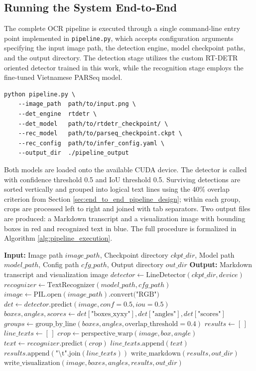 \subsection{Running the System End-to-End}
The complete OCR pipeline is executed through a single command-line entry point implemented in \texttt{pipeline.py}, which accepts configuration arguments specifying the input image path, the detection engine, model checkpoint paths, and the output directory. The detection stage utilizes the custom RT-DETR oriented detector trained in this work, while the recognition stage employs the fine-tuned Vietnamese PARSeq model. 

\begin{verbatim}
python pipeline.py \
    --image_path  path/to/input.png \
    --det_engine  rtdetr \
    --det_model   path/to/rtdetr_checkpoint/ \
    --rec_model   path/to/parseq_checkpoint.ckpt \
    --rec_config  path/to/infer_config.yaml \
    --output_dir  ./pipeline_output
\end{verbatim}

Both models are loaded onto the available CUDA device. The detector is called with confidence threshold 0.5 and IoU threshold 0.5. Surviving detections are sorted vertically and grouped into logical text lines using the 40\% overlap criterion from Section \ref{sec:end_to_end_pipeline_design}; within each group, crops are processed left to right and joined with tab separators. Two output files are produced: a Markdown transcript and a visualization image with bounding boxes in red and recognized text in blue. The full procedure is formalized in Algorithm \ref{alg:pipeline_execution}.

\begin{algorithm}[ht]
\caption{End-to-End OCR Pipeline Execution}
\label{alg:pipeline_execution}
\begin{algorithmic}[1]
\Statex \textbf{Input:} Image path $image\_path$, Checkpoint directory $ckpt\_dir$, Model path $model\_path$, Config path $cfg\_path$, Output directory $out\_dir$
\Statex \textbf{Output:} Markdown transcript and visualization image
\State $detector \gets \text{LineDetector}(ckpt\_dir, device)$
\State $recognizer \gets \text{TextRecognizer}(model\_path, cfg\_path)$
\State $image \gets \text{PIL.open}(image\_path)\text{.convert("RGB")}$
\State $det \gets detector.\text{predict}(image, conf=0.5, iou=0.5)$
\State $boxes, angles, scores \gets det[\text{"boxes\_xyxy"}], det[\text{"angles"}], det[\text{"scores"}]$
\State $groups \gets \text{group\_by\_line}(boxes, angles, \text{overlap\_threshold}=0.4)$
\State $results \gets [\,]$
\For{\textbf{each} $group$ \textbf{in} $groups$ (sorted top-to-bottom)}
    \State $line\_texts \gets [\,]$
        \State $crop \gets \text{perspective\_warp}(image, box, angle)$
        \State $text \gets recognizer.\text{predict}(crop)$
        \State $line\_texts.\text{append}(text)$
    \EndFor
    \State $results.\text{append}(\text{"\textbackslash t".join}(line\_texts))$
\EndFor
\State $\text{write\_markdown}(results, out\_dir)$
\State $\text{write\_visualization}(image, boxes, angles, results, out\_dir)$
\end{algorithmic}
\end{algorithm}
